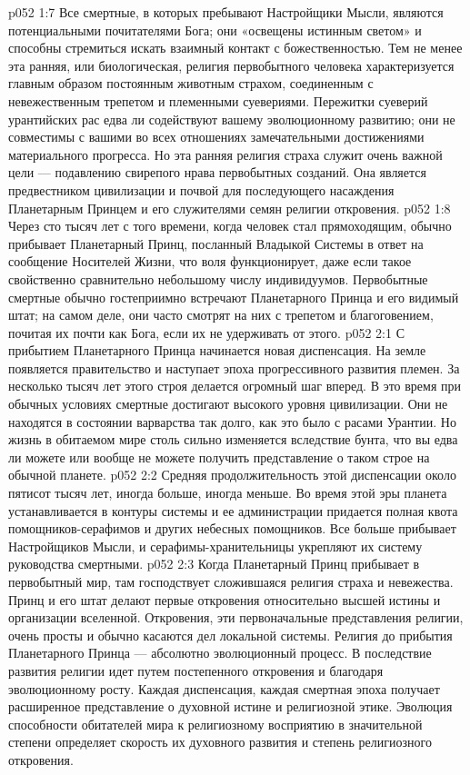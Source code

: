 \vs p052 1:7 Все смертные, в которых пребывают Настройщики Мысли, являются потенциальными почитателями Бога; они «освещены истинным светом» и способны стремиться искать взаимный контакт с божественностью. Тем не менее эта ранняя, или биологическая, религия первобытного человека характеризуется главным образом постоянным животным страхом, соединенным с невежественным трепетом и племенными суевериями. Пережитки суеверий урантийских рас едва ли содействуют вашему эволюционному развитию; они не совместимы с вашими во всех отношениях замечательными достижениями материального прогресса. Но эта ранняя религия страха служит очень важной цели --- подавлению свирепого нрава первобытных созданий. Она является предвестником цивилизации и почвой для последующего насаждения Планетарным Принцем и его служителями семян религии откровения.
\vs p052 1:8 \pc Через сто тысяч лет с того времени, когда человек стал прямоходящим, обычно прибывает Планетарный Принц, посланный Владыкой Системы в ответ на сообщение Носителей Жизни, что воля функционирует, даже если такое свойственно сравнительно небольшому числу индивидуумов. Первобытные смертные обычно гостеприимно встречают Планетарного Принца и его видимый штат; на самом деле, они часто смотрят на них с трепетом и благоговением, почитая их почти как Бога, если их не удерживать от этого.
\vs p052 2:1 С прибытием Планетарного Принца начинается новая диспенсация. На земле появляется правительство и наступает эпоха прогрессивного развития племен. За несколько тысяч лет этого строя делается огромный шаг вперед. В это время при обычных условиях смертные достигают высокого уровня цивилизации. Они не находятся в состоянии варварства так долго, как это было с расами Урантии. Но жизнь в обитаемом мире столь сильно изменяется вследствие бунта, что вы едва ли можете или вообще не можете получить представление о таком строе на обычной планете.
\vs p052 2:2 Средняя продолжительность этой диспенсации около пятисот тысяч лет, иногда больше, иногда меньше. Во время этой эры планета устанавливается в контуры системы и ее администрации придается полная квота помощников\hyp{}серафимов и других небесных помощников. Все больше прибывает Настройщиков Мысли, и серафимы\hyp{}хранительницы укрепляют их систему руководства смертными.
\vs p052 2:3 Когда Планетарный Принц прибывает в первобытный мир, там господствует сложившаяся религия страха и невежества. Принц и его штат делают первые откровения относительно высшей истины и организации вселенной. Откровения, эти первоначальные представления религии, очень просты и обычно касаются дел локальной системы. Религия до прибытия Планетарного Принца --- абсолютно эволюционный процесс. В последствие развития религии идет путем постепенного откровения и благодаря эволюционному росту. Каждая диспенсация, каждая смертная эпоха получает расширенное представление о духовной истине и религиозной этике. Эволюция способности обитателей мира к религиозному восприятию в значительной степени определяет скорость их духовного развития и степень религиозного откровения.
